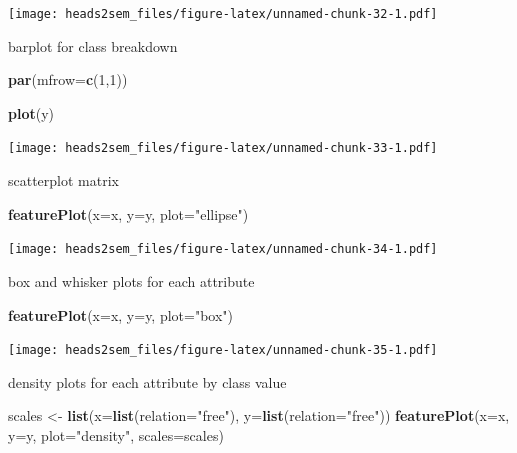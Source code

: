 \documentclass[]{book}
\newenvironment{Shaded}{\begin{snugshade}}{\end{snugshade}}
\newcommand{\DataTypeTok}[1]{\textcolor[rgb]{0.13,0.29,0.53}{#1}}
\newcommand{\DecValTok}[1]{\textcolor[rgb]{0.00,0.00,0.81}{#1}}
\newcommand{\KeywordTok}[1]{\textcolor[rgb]{0.13,0.29,0.53}{\textbf{#1}}}
\newcommand{\NormalTok}[1]{#1}
\newcommand{\StringTok}[1]{\textcolor[rgb]{0.31,0.60,0.02}{#1}}
\begin{document}
\texttt{[image: heads2sem\_files/figure-latex/unnamed-chunk-32-1.pdf]}

barplot for class breakdown

\begin{Shaded}
\begin{Highlighting}[]
\KeywordTok{par}\NormalTok{(}\DataTypeTok{mfrow=}\KeywordTok{c}\NormalTok{(}\DecValTok{1}\NormalTok{,}\DecValTok{1}\NormalTok{))}

\KeywordTok{plot}\NormalTok{(y)}
\end{Highlighting}
\end{Shaded}

\texttt{[image: heads2sem\_files/figure-latex/unnamed-chunk-33-1.pdf]}

scatterplot matrix

\begin{Shaded}
\begin{Highlighting}[]
\KeywordTok{featurePlot}\NormalTok{(}\DataTypeTok{x=}\NormalTok{x, }\DataTypeTok{y=}\NormalTok{y, }\DataTypeTok{plot=}\StringTok{"ellipse"}\NormalTok{)}
\end{Highlighting}
\end{Shaded}

\texttt{[image: heads2sem\_files/figure-latex/unnamed-chunk-34-1.pdf]}

box and whisker plots for each attribute

\begin{Shaded}
\begin{Highlighting}[]
\KeywordTok{featurePlot}\NormalTok{(}\DataTypeTok{x=}\NormalTok{x, }\DataTypeTok{y=}\NormalTok{y, }\DataTypeTok{plot=}\StringTok{"box"}\NormalTok{)}
\end{Highlighting}
\end{Shaded}

\texttt{[image: heads2sem\_files/figure-latex/unnamed-chunk-35-1.pdf]}

density plots for each attribute by class value

\begin{Shaded}
\begin{Highlighting}[]
\NormalTok{scales <-}\StringTok{ }\KeywordTok{list}\NormalTok{(}\DataTypeTok{x=}\KeywordTok{list}\NormalTok{(}\DataTypeTok{relation=}\StringTok{"free"}\NormalTok{), }\DataTypeTok{y=}\KeywordTok{list}\NormalTok{(}\DataTypeTok{relation=}\StringTok{"free"}\NormalTok{))}
\KeywordTok{featurePlot}\NormalTok{(}\DataTypeTok{x=}\NormalTok{x, }\DataTypeTok{y=}\NormalTok{y, }\DataTypeTok{plot=}\StringTok{"density"}\NormalTok{, }\DataTypeTok{scales=}\NormalTok{scales)}
\end{Highlighting}
\end{Shaded}
\end{document}
